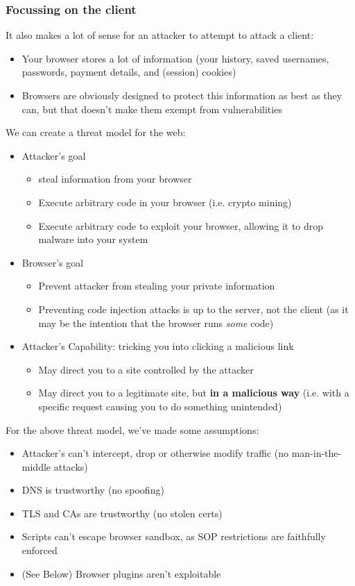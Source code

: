 \documentclass{article}
\begin{document}
\subsubsection{Focussing on the client}
It also makes a lot of sense for an attacker to attempt to attack a client:
\begin{itemize}
    \item Your browser stores a lot of information (your history, saved usernames, passwords, payment details, and (session) cookies)
    \item Browsers are obviously designed to protect this information as best as they can, but that doesn't make them exempt from vulnerabilities
\end{itemize}
We can create a threat model for the web:
\begin{itemize}
    \item Attacker's goal
        \begin{itemize}
            \item steal information from your browser
            \item Execute arbitrary code in your browser (i.e. crypto mining)
            \item Execute arbitrary code to exploit your browser, allowing it to drop malware into your system
        \end{itemize}
    \item Browser's goal
        \begin{itemize}
            \item Prevent attacker from stealing your private information
            \item Preventing code injection attacks is up to the server, not the client (as it may be the intention that the browser runs \textit{some} code)
        \end{itemize}
    \item Attacker's Capability: tricking you into clicking a malicious link
        \begin{itemize}
            \item May direct you to a site controlled by the attacker
            \item May direct you to a legitimate site, but \textbf{in a malicious way} (i.e. with a specific request causing you to do something unintended)
        \end{itemize}
\end{itemize}
For the above threat model, we've made some assumptions:
\begin{itemize}
    \item Attacker's can't intercept, drop or otherwise modify traffic (no man-in-the-middle attacks)
    \item DNS is trustworthy (no spoofing)
    \item TLS and CAs are trustworthy (no stolen certs)
    \item Scripts can't escape browser sandbox, as SOP restrictions are faithfully enforced
    \item (See Below) Browser plugins aren't exploitable
\end{itemize}
\end{document}
